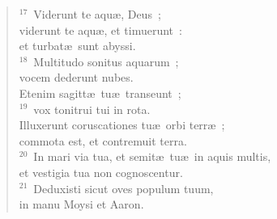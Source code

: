 \begin{verse}
${}^{17}$~Viderunt te aqu\ae , Deus~;\\ viderunt te aqu\ae , et timuerunt~:\\ et turbat\ae\ sunt abyssi.\\
${}^{18}$~Multitudo sonitus aquarum~;\\ vocem dederunt nubes.\\ Etenim sagitt\ae\ tu\ae\ transeunt~;\\
${}^{19}$~vox tonitrui tui in rota.\\ Illuxerunt coruscationes tu\ae\ orbi terr\ae~;\\ commota est, et contremuit terra.\\
${}^{20}$~In mari via tua, et semit\ae\ tu\ae\ in aquis multis,\\ et vestigia tua non cognoscentur.\\
${}^{21}$~Deduxisti sicut oves populum tuum,\\ in manu Moysi et Aaron.\end{verse}



